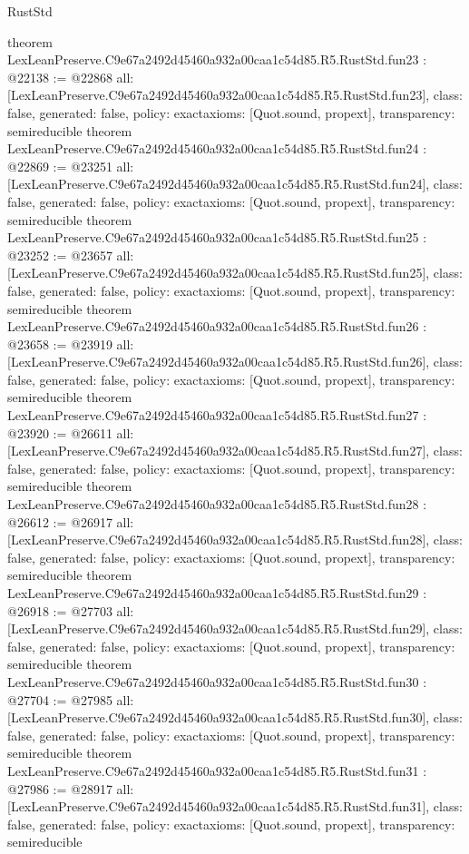 \begin{lexlean}{RustStd}
\begin{coremodule}
{}
theorem LexLeanPreserve.C9e67a2492d45460a932a00caa1c54d85.R5.RustStd.fun23 : @22138 := @22868 {
  all: [LexLeanPreserve.C9e67a2492d45460a932a00caa1c54d85.R5.RustStd.fun23],
  class: false,
  generated: false,
  policy: exact{axioms: [Quot.sound, propext]},
  transparency: semireducible
}
theorem LexLeanPreserve.C9e67a2492d45460a932a00caa1c54d85.R5.RustStd.fun24 : @22869 := @23251 {
  all: [LexLeanPreserve.C9e67a2492d45460a932a00caa1c54d85.R5.RustStd.fun24],
  class: false,
  generated: false,
  policy: exact{axioms: [Quot.sound, propext]},
  transparency: semireducible
}
theorem LexLeanPreserve.C9e67a2492d45460a932a00caa1c54d85.R5.RustStd.fun25 : @23252 := @23657 {
  all: [LexLeanPreserve.C9e67a2492d45460a932a00caa1c54d85.R5.RustStd.fun25],
  class: false,
  generated: false,
  policy: exact{axioms: [Quot.sound, propext]},
  transparency: semireducible
}
theorem LexLeanPreserve.C9e67a2492d45460a932a00caa1c54d85.R5.RustStd.fun26 : @23658 := @23919 {
  all: [LexLeanPreserve.C9e67a2492d45460a932a00caa1c54d85.R5.RustStd.fun26],
  class: false,
  generated: false,
  policy: exact{axioms: [Quot.sound, propext]},
  transparency: semireducible
}
theorem LexLeanPreserve.C9e67a2492d45460a932a00caa1c54d85.R5.RustStd.fun27 : @23920 := @26611 {
  all: [LexLeanPreserve.C9e67a2492d45460a932a00caa1c54d85.R5.RustStd.fun27],
  class: false,
  generated: false,
  policy: exact{axioms: [Quot.sound, propext]},
  transparency: semireducible
}
theorem LexLeanPreserve.C9e67a2492d45460a932a00caa1c54d85.R5.RustStd.fun28 : @26612 := @26917 {
  all: [LexLeanPreserve.C9e67a2492d45460a932a00caa1c54d85.R5.RustStd.fun28],
  class: false,
  generated: false,
  policy: exact{axioms: [Quot.sound, propext]},
  transparency: semireducible
}
theorem LexLeanPreserve.C9e67a2492d45460a932a00caa1c54d85.R5.RustStd.fun29 : @26918 := @27703 {
  all: [LexLeanPreserve.C9e67a2492d45460a932a00caa1c54d85.R5.RustStd.fun29],
  class: false,
  generated: false,
  policy: exact{axioms: [Quot.sound, propext]},
  transparency: semireducible
}
theorem LexLeanPreserve.C9e67a2492d45460a932a00caa1c54d85.R5.RustStd.fun30 : @27704 := @27985 {
  all: [LexLeanPreserve.C9e67a2492d45460a932a00caa1c54d85.R5.RustStd.fun30],
  class: false,
  generated: false,
  policy: exact{axioms: [Quot.sound, propext]},
  transparency: semireducible
}
theorem LexLeanPreserve.C9e67a2492d45460a932a00caa1c54d85.R5.RustStd.fun31 : @27986 := @28917 {
  all: [LexLeanPreserve.C9e67a2492d45460a932a00caa1c54d85.R5.RustStd.fun31],
  class: false,
  generated: false,
  policy: exact{axioms: [Quot.sound, propext]},
  transparency: semireducible
}
\end{coremodule}
\end{lexlean}
